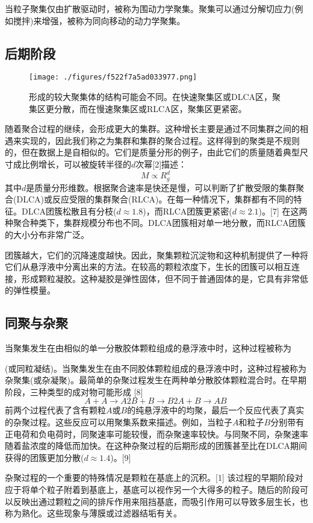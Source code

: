 当粒子聚集仅由扩散驱动时，被称为围动力学聚集。聚集可以通过分解切应力(例如搅拌)来增强，被称为同向移动的动力学聚集。

\subsection{后期阶段}
\begin{figure}[ht]
\centering
\texttt{[image: ./figures/f522f7a5ad033977.png]}
\caption{形成的较大聚集体的结构可能会不同。在快速聚集区或DLCA区，聚集区更分散，而在慢速聚集区或RLCA区，聚集区更紧密。} \label{fig_LZJH_2}
\end{figure}
随着聚合过程的继续，会形成更大的集群。这种增长主要是通过不同集群之间的相遇来实现的，因此我们称之为集群和集群的聚合过程。这样得到的聚类是不规则的，但在数据上是自相似的。它们是质量分形的例子，由此它们的质量随着典型尺寸成比例增长，可以被旋转半径的$d$次幂[2]描述：
$$M \propto R_{g}^{d}~$$
其中$d$是质量分形维数。根据聚合速率是快还是慢，可以判断了扩散受限的集群聚合(DLCA)或反应受限的集群聚合(RLCA)。在每一种情况下，集群都有不同的特征。DLCA团簇松散且有分枝($d \approx 1.8$)，而RLCA团簇更紧密($d \approx 2.1$)。[7] 在这两种聚合种类下，集群规模分布也不同。DLCA团簇相对单一地分散，而RLCA团簇的大小分布非常广泛。

团簇越大，它们的沉降速度越快。因此，聚集颗粒沉淀物和这种机制提供了一种将它们从悬浮液中分离出来的方法。在较高的颗粒浓度下，生长的团簇可以相互连接，形成颗粒凝胶。这种凝胶是弹性固体，但不同于普通固体的是，它具有非常低的弹性模量。

\subsection{同聚与杂聚}
当聚集发生在由相似的单一分散胶体颗粒组成的悬浮液中时，这种过程被称为

(或同粒凝结)。当聚集发生在由不同胶体颗粒组成的悬浮液中时，这种过程被称为杂聚集(或杂凝聚)。最简单的杂聚过程发生在两种单分散胶体颗粒混合时。在早期阶段，三种类型的成对物可能形成 [8]
$$A + A \to A2 B + B \to B2 A + B \to AB~$$
前两个过程代表了含有颗粒$A$或$B$的纯悬浮液中的均聚，最后一个反应代表了真实的杂聚过程。这些反应可以用聚集系数来描述。例如，当粒子$A$和粒子$B$分别带有正电荷和负电荷时，同聚速率可能较慢，而杂聚速率较快。与同聚不同，杂聚速率随着盐浓度的降低而加快。在这种杂聚过程的后期形成的团簇甚至比在DLCA期间获得的团簇更加分散($d \approx 1.4$)。[9]

杂聚过程的一个重要的特殊情况是颗粒在基底上的沉积。[1] 该过程的早期阶段对应于将单个粒子附着到基底上，基底可以视作另一个大得多的粒子。随后的阶段可以反映出通过颗粒之间的排斥作用来阻挡基底，而吸引作用可以导致多层生长，也称为熟化。这些现象与薄膜或过滤器结垢有关。

